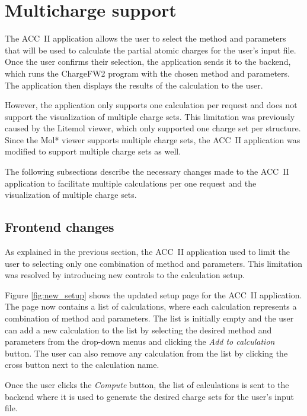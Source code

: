 \documentclass[
  digital,     %
  oneside,     %
  nosansbold,  %
  nocolorbold, %
  lof,         %
  lot,         %
]{fithesis4}
\begin{document}
\section{Multicharge support}
\label{section:multicharge_support}

The ACC~II application allows the user to select the method and parameters that will be used to calculate the partial atomic charges for the user's input file. Once the user confirms their selection, the application sends it to the backend, which runs the ChargeFW2 program with the chosen method and parameters. The application then displays the results of the calculation to the user.

However, the application only supports one calculation per request and does not support the visualization of multiple charge sets. This limitation was previously caused by the Litemol viewer, which only supported one charge set per structure. Since the Mol* viewer supports multiple charge sets, the ACC~II application was modified to support multiple charge sets as well.

The following subsections describe the necessary changes made to the ACC~II application to facilitate multiple calculations per one request and the visualization of multiple charge sets.

\subsection{Frontend changes}

As explained in the previous section, the ACC~II application used to limit the user to selecting only one combination of method and parameters. This limitation was resolved by introducing new controls to the calculation setup.

Figure \ref{fig:new_setup} shows the updated setup page for the ACC~II application. The page now contains a list of calculations, where each calculation represents a combination of method and parameters. The list is initially empty and the user can add a new calculation to the list by selecting the desired method and parameters from the drop-down menus and clicking the \textit{Add to calculation} button. The user can also remove any calculation from the list by clicking the cross button next to the calculation name.

Once the user clicks the \textit{Compute} button, the list of calculations is sent to the backend where it is used to generate the desired charge sets for the user's input file.
\end{document}
